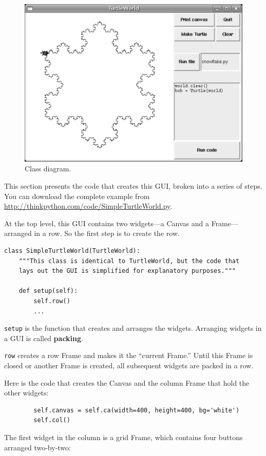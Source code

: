 \documentclass[10pt]{book}
\begin{document}
\begin{figure}
\centerline{\includegraphics[scale=0.5]{figs/TurtleWorld.pdf}}
\caption{Class diagram.}
\label{fig.turtleworld}
\end{figure}


This section presents the code that creates this GUI, broken into a
series of steps.  You can download the complete example
from \url{http://thinkpython.com/code/SimpleTurtleWorld.py}.

At the top level, this GUI contains two widgets---a Canvas and a
Frame---arranged in a row.  So the first step is to create the row.

\begin{verbatim}
class SimpleTurtleWorld(TurtleWorld):
    """This class is identical to TurtleWorld, but the code that
    lays out the GUI is simplified for explanatory purposes."""

    def setup(self):
        self.row()
        ...
\end{verbatim}
%
{\tt setup} is the function that creates and arranges the widgets.
Arranging widgets in a GUI is called {\bf packing}.

{\tt row} creates a row Frame and makes it the ``current Frame.''
Until this Frame is closed or another Frame is created, all
subsequent widgets are packed in a row.

Here is the code that creates the Canvas and the column Frame
that hold the other widgets:

\begin{verbatim}
        self.canvas = self.ca(width=400, height=400, bg='white')
        self.col()
\end{verbatim}
%
The first widget in the column is a grid Frame, which contains
four buttons arranged two-by-two:
\end{document}

